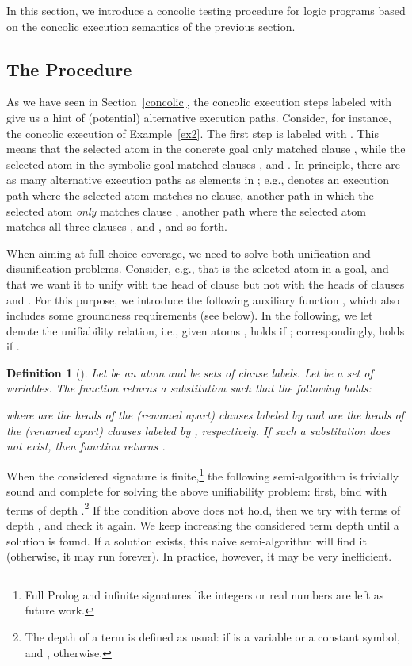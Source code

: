 \documentclass[fleqn]{tlp}
\newtheorem{definition}{Definition} \newtheorem{example}{Example} \newtheorem{lemma}{Lemma} \newtheorem{proposition}{Proposition} \newtheorem{theorem}{Theorem} \newtheorem{corollary}{Corollary}
\begin{document}
In this section, we introduce a concolic testing procedure for logic
programs based on the concolic execution semantics of the previous
section.

\subsection{The Procedure}

As we have seen in Section~\ref{concolic}, the concolic execution
steps labeled with  give us a hint of (potential)
alternative execution paths. Consider, for instance, the concolic
execution of Example~\ref{ex2}. The first step is labeled with
. This means that the selected
atom in the concrete goal only matched clause , while the
selected atom in the symbolic goal matched clauses , 
and . In principle, there are as many alternative execution
paths as elements in
; e.g.,
 denotes an execution path where the selected atom matches no
clause,  another path in which the selected atom
\emph{only} matches clause , 
another path where the selected atom matches all three clauses
,  and , and so forth.

When aiming at full choice coverage, we need to
solve both unification and disunification problems. Consider, e.g.,
that  is the selected atom in a goal, and that we want it to unify
with the head of clause  but not with the heads of clauses
 and . For this purpose, we introduce the following
auxiliary function , which also includes some groundness
requirements (see below). In the following, we let  denote
the unifiability relation, i.e., given atoms ,  holds
if ; correspondingly,  holds if
.

\begin{definition}[] \label{def:alt}
  Let  be an atom and  be sets of clause labels. Let
   be a set of variables.  The function 
  returns a substitution  such that the following holds:
  
  where  are the heads of the (renamed apart) clauses
  labeled by  and  are the heads of the
  (renamed apart) clauses labeled by ,
  respectively. 
If such a substitution does not exist, then function  returns
  .
\end{definition}
When the considered signature is finite,\!\footnote{Full Prolog and
  infinite signatures like integers or real numbers are left as future
  work.}  the following semi-algorithm is trivially sound and complete
for solving the above unifiability problem: first, bind  with terms
of depth .\footnote{The depth  of a term  is defined
  as usual:  if  is a variable or a constant symbol,
  and , otherwise.} If the
condition above does not hold, then we try with terms of depth ,
and check it again. We keep increasing the considered term depth until
a solution is found. If a solution exists, this naive semi-algorithm will
find it (otherwise, it may run forever). 
In practice, however, it may be very inefficient.
\end{document}
